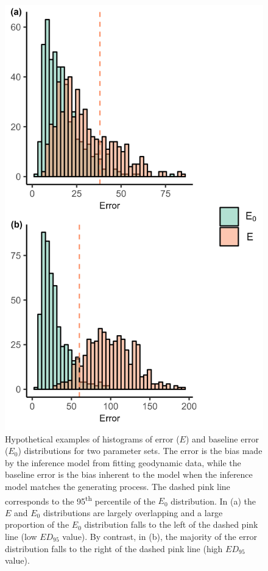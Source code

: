 \documentclass{article}
\begin{document}
\begin{figure}
    \includegraphics{JBI-21-0508_Fig3.png}
    \caption{Hypothetical examples of histograms of error ($E$) and baseline error ($E_0$) distributions for two parameter sets. The error is the bias made by the inference model from fitting geodynamic data, while the baseline error is the bias inherent to the model when the inference model matches the generating process. The dashed pink line corresponds to the 95\textsuperscript{th} percentile of the $E_0$ distribution. In (a) the $E$ and $E_0$ distributions are largely overlapping and a large proportion of the $E_0$ distribution falls to the left of the dashed pink line (low $ED_{95}$ value). By contrast, in (b), the majority of the error distribution falls to the right of the dashed pink line (high $ED_{95}$ value).}
    \label{fig:hist_spec_nltt}
\end{figure}
\end{document}
